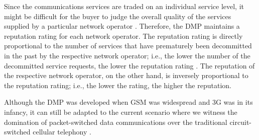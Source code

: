 Since the communications services are traded on an individual service level, it might be difficult for the buyer to judge the overall quality of the services supplied by a particular network operator \cite{DMIrvine02}. Therefore, the DMP maintains a reputation rating for each network operator. The reputation rating is directly proportional to the number of services that have prematurely been decommitted in the past by the respective network operator; i.e., the lower the number of the decommitted service requests, the lower the reputation rating \cite{DMLeBodic00}. The reputation of the respective network operator, on the other hand, is inversely proportional to the reputation rating; i.e., the lower the rating, the higher the reputation.

Although the DMP was developed when GSM was widespread and 3G was in its infancy, it can still be adapted to the current scenario where we witness the domination of packet-switched data communications over the traditional circuit-switched cellular telephony \cite{Ericsson2011}.

